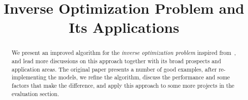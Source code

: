 \documentclass[conference]{IEEEtran}
\begin{document}
\title{Inverse Optimization Problem and Its Applications}
\author{\authors}

\maketitle

\begin{abstract}
  We present an improved algorithm for the \textit{inverse optimization problem} inspired from~\cite{keshavarz2011}, and lead more discussions on this approach together with its broad prospects and application areas. The original paper presents a number of good examples, after re-implementing the models, we refine the algorithm, discuss the performance and some factors that make the difference, and apply this approach to some more projects in the evaluation section.
\end{abstract}

\IEEEpeerreviewmaketitle








\end{document}
